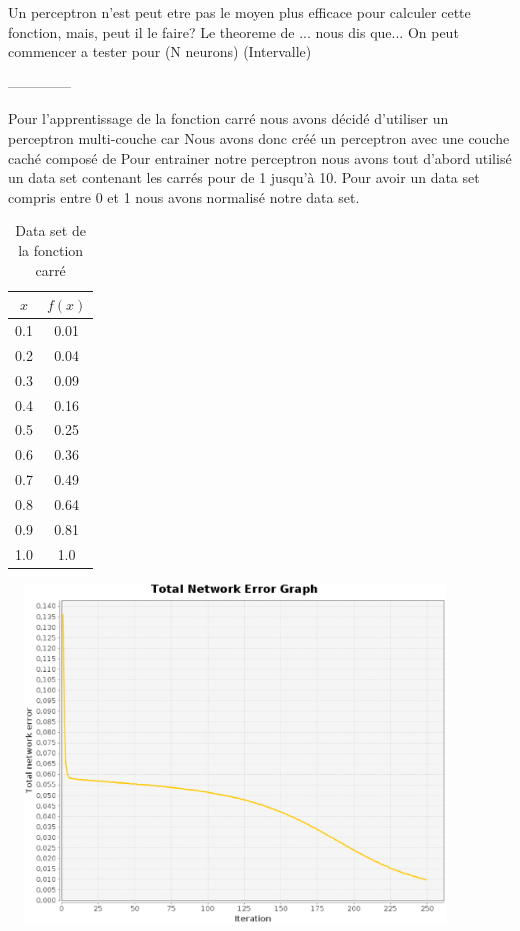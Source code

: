\documentclass[twoside,openright,a4paper,11pt,french]{article}
\begin{document}
Un perceptron n'est peut etre pas le moyen plus efficace pour calculer cette 
fonction, mais, peut il le faire? Le theoreme de ... nous dis que...
On peut commencer a tester pour (N neurons) (Intervalle)

--------------

Pour l'apprentissage de la fonction carré nous avons décidé d'utiliser un perceptron
multi-couche car %
Nous avons donc créé un perceptron avec une couche caché composé de %
Pour entrainer notre perceptron nous avons tout d'abord utilisé un data set contenant
les carrés pour de 1 jusqu'à 10. Pour avoir un data set compris entre 0 et 1 nous avons
normalisé notre data set.

\begin{table}[h]
  \centering
  \begin{tabular}{| c | c |}
    \hline
    \textbf{$x$} & \textbf{$f(x)$}\\
    \hline
    0.1 & 0.01 \\
    \hline
    0.2 & 0.04 \\
    \hline
    0.3 & 0.09 \\
    \hline
    0.4 & 0.16 \\
    \hline
    0.5 & 0.25 \\
    \hline
    0.6 & 0.36 \\
    \hline
    0.7 & 0.49 \\
    \hline
    0.8 & 0.64 \\
    \hline
    0.9 & 0.81 \\
    \hline
    1.0 & 1.0 \\
    \hline
  \end{tabular}
  \caption{Data set de la fonction carré}
  \label{tab:eq}
\end{table}

\includegraphics[width=12cm,height=9cm]{./pics/fct/carre_10_norm_std.eps}





\end{document}
